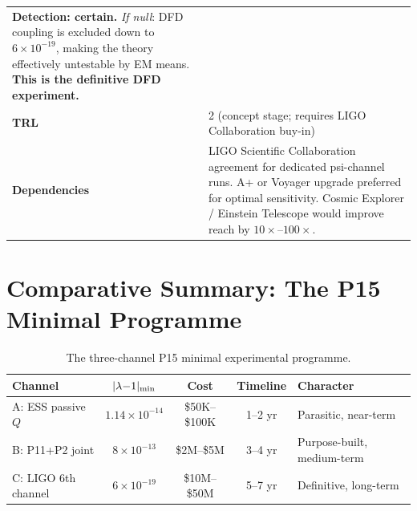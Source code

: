 \documentclass[11pt]{article}
\newcommand{\ee}[1]{\times 10^{#1}}
\newcommand{\lamdiff}{|\lambda{-}1|}
\begin{document}
\begin{table}[H]
\begin{tabular}{p{4cm}p{8cm}}
  \textbf{Detection: certain.}
  \textit{If null}: DFD coupling is excluded down to $6\ee{-19}$,
  making the theory effectively untestable by EM means.
  \textbf{This is the definitive DFD experiment.} \\
\textbf{TRL} & 2 (concept stage; requires LIGO Collaboration buy-in) \\
\textbf{Dependencies} & LIGO Scientific Collaboration agreement for
  dedicated psi-channel runs. A+ or Voyager upgrade preferred for
  optimal sensitivity. Cosmic Explorer / Einstein Telescope would
  improve reach by $10\times$--$100\times$. \\
\bottomrule
\end{tabular}
\end{table}

\section{Comparative Summary: The P15 Minimal Programme}
\label{sec:P15-programme}

\begin{table}[H]
\centering
\caption{The three-channel P15 minimal experimental programme.}
\label{tab:P15-minimal}
\begin{tabular}{lcccl}
\toprule
\textbf{Channel} & $\lamdiff_{\rm min}$ & \textbf{Cost} & \textbf{Timeline} & \textbf{Character} \\
\midrule
A: ESS passive $Q$ & $1.14\ee{-14}$ & \$50K--\$100K & 1--2 yr & Parasitic, near-term \\
B: P11+P2 joint & $8\ee{-13}$ & \$2M--\$5M & 3--4 yr & Purpose-built, medium-term \\
C: LIGO 6th channel & $6\ee{-19}$ & \$10M--\$50M & 5--7 yr & Definitive, long-term \\
\bottomrule
\end{tabular}
\end{table}
\end{document}
